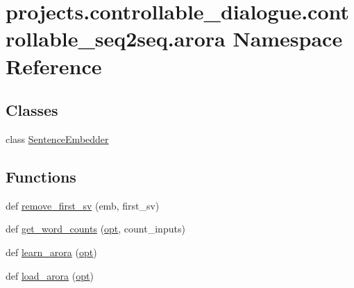 \hypertarget{namespaceprojects_1_1controllable__dialogue_1_1controllable__seq2seq_1_1arora}{}\section{projects.\+controllable\+\_\+dialogue.\+controllable\+\_\+seq2seq.\+arora Namespace Reference}
\label{namespaceprojects_1_1controllable__dialogue_1_1controllable__seq2seq_1_1arora}
\subsection*{Classes}
\begin{DoxyCompactItemize}
\item 
class \hyperlink{classprojects_1_1controllable__dialogue_1_1controllable__seq2seq_1_1arora_1_1SentenceEmbedder}{Sentence\+Embedder}
\end{DoxyCompactItemize}
\subsection*{Functions}
\begin{DoxyCompactItemize}
\item 
def \hyperlink{namespaceprojects_1_1controllable__dialogue_1_1controllable__seq2seq_1_1arora_a09f85328842233be3deb489594521c6f}{remove\+\_\+first\+\_\+sv} (emb, first\+\_\+sv)
\item 
def \hyperlink{namespaceprojects_1_1controllable__dialogue_1_1controllable__seq2seq_1_1arora_a2a5256a5d5666134bc2a89b0fe831fcd}{get\+\_\+word\+\_\+counts} (\hyperlink{namespaceprojects_1_1controllable__dialogue_1_1controllable__seq2seq_1_1arora_a2cdfcf7449581870a10f134649dd8d7f}{opt}, count\+\_\+inputs)
\item 
def \hyperlink{namespaceprojects_1_1controllable__dialogue_1_1controllable__seq2seq_1_1arora_a4fba2bc46a41b5255407e76ca52e0398}{learn\+\_\+arora} (\hyperlink{namespaceprojects_1_1controllable__dialogue_1_1controllable__seq2seq_1_1arora_a2cdfcf7449581870a10f134649dd8d7f}{opt})
\item 
def \hyperlink{namespaceprojects_1_1controllable__dialogue_1_1controllable__seq2seq_1_1arora_aaea3eb10fd28246497bb20a148a26da8}{load\+\_\+arora} (\hyperlink{namespaceprojects_1_1controllable__dialogue_1_1controllable__seq2seq_1_1arora_a2cdfcf7449581870a10f134649dd8d7f}{opt})
\end{DoxyCompactItemize}
